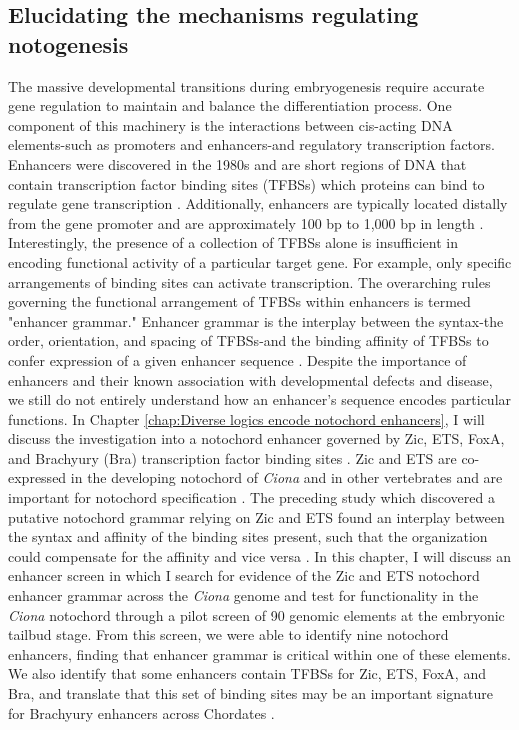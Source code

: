 \begin{dissertationintroduction}
    \section{Elucidating the mechanisms regulating notogenesis}

    The massive developmental transitions during embryogenesis require accurate gene regulation to maintain and balance the differentiation process. One component of this machinery is the interactions between cis-acting DNA elements-such as promoters and enhancers-and regulatory transcription factors. Enhancers were discovered in the 1980s and are short regions of DNA that contain transcription factor binding sites (TFBSs) which proteins can bind to regulate gene transcription \cite{khoury1983, kvon2021, levine2010}. Additionally, enhancers are typically located distally from the gene promoter and are approximately 100 bp to 1,000 bp in length \cite{khoury1983, levine2010}. Interestingly, the presence of a collection of TFBSs alone is insufficient in encoding functional activity of a particular target gene. For example, only specific arrangements of binding sites can activate transcription. The overarching rules governing the functional arrangement of TFBSs within enhancers is termed "enhancer grammar." Enhancer grammar is the interplay between the syntax-the order, orientation, and spacing of TFBSs-and the binding affinity of TFBSs to confer expression of a given enhancer sequence \cite{arnone1997, jindal2021}. Despite the importance of enhancers and their known association with developmental defects and disease, we still do not entirely understand how an enhancer’s sequence encodes particular functions. In Chapter \ref{chap:Diverse logics encode notochord enhancers}, I will discuss the investigation into a notochord enhancer governed by Zic, ETS, FoxA, and Brachyury (Bra) transcription factor binding sites \cite{farley2016, song2022}. Zic and ETS are co-expressed in the developing notochord of \textit{Ciona} and in other vertebrates and are important for notochord specification \cite{dykes2018,matsumoto2007a}. The preceding study which discovered a putative notochord grammar relying on Zic and ETS found an interplay between the syntax and affinity of the binding sites present, such that the organization could compensate for the affinity and vice versa \cite{farley2016}. In this chapter, I will discuss an enhancer screen in which I search for evidence of the Zic and ETS notochord enhancer grammar across the \textit{Ciona} genome and test for functionality in the \textit{Ciona} notochord through a pilot screen of 90 genomic elements at the embryonic tailbud stage. From this screen, we were able to identify nine notochord enhancers, finding that enhancer grammar is critical within one of these elements. We also identify that some enhancers contain TFBSs for Zic, ETS, FoxA, and Bra, and translate that this set of binding sites may be an important signature for Brachyury enhancers across Chordates \cite{song2022}. 
    

\end{dissertationintroduction}
